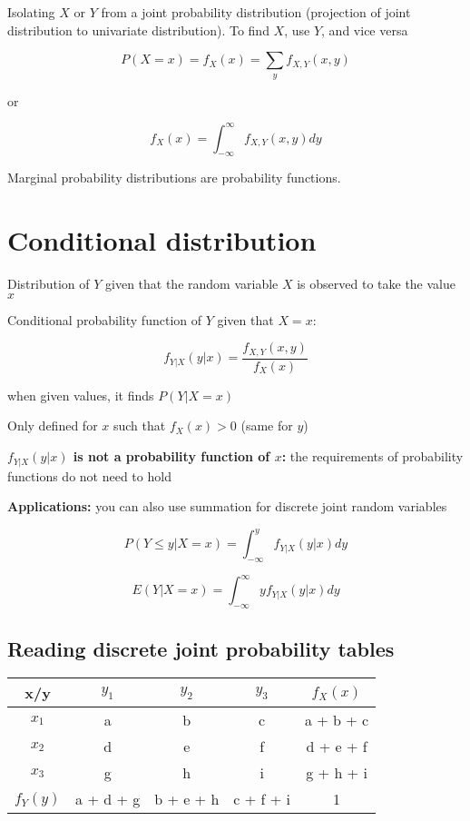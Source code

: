 \documentclass[twocolumn, 8pt]{extarticle}
\begin{document}
Isolating $X$ or $Y$ from a joint probability distribution (projection of joint distribution to univariate distribution). To find $X$, use $Y$, and vice versa

$$
P(X = x) = f_X(x) = \sum_{y}f_{X, Y}(x, y)
$$

or

$$
f_X(x) = \int_{-\infty}^{\infty} f_{X, Y}(x, y) dy
$$

Marginal probability distributions are probability functions.

\section*{Conditional distribution}

Distribution of $Y$ given that the random variable $X$ is observed to take the value $x$

Conditional probability function of $Y$ given that $X = x$:

$$
f_{Y | X} (y | x) = \frac{f_{X, Y}(x, y)}{f_X(x)}
$$

when given values, it finds $P(Y | X = x)$

Only defined for $x$ such that $f_X(x) > 0$ (same for $y$)

\textbf{$f_{Y | X} (y | x)$ is not a probability function of $x$:} the requirements of probability functions do not need to hold

\textbf{Applications:} you can also use summation for discrete joint random variables

$$
P(Y \leq y | X = x) = \int_{-\infty}^y f_{Y | X} (y | x) dy
$$

$$
E(Y | X = x) = \int_{-\infty}^{\infty} y f_{Y | X} (y | x) dy
$$

\subsection*{Reading discrete joint probability tables}

\begin{center}
    \begin{tabular}{|c|c|c|c|c|}
        \hline
        x/y & $y_1$ & $y_2$ & $y_3$ & $f_X(x)$ \\
        \hline
        $x_1$ & a & b & c & a + b + c \\
        $x_2$ & d & e & f & d + e + f \\
        $x_3$ & g & h & i & g + h + i \\
        \hline
        $f_Y(y)$ & a + d + g & b + e + h & c + f + i & 1 \\
        \hline
    \end{tabular}
\end{center}
\end{document}
